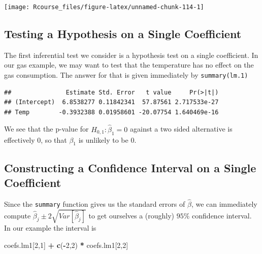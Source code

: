 \documentclass[]{book}
\newenvironment{Shaded}{\begin{snugshade}}{\end{snugshade}}
\newcommand{\KeywordTok}[1]{\textcolor[rgb]{0.13,0.29,0.53}{\textbf{#1}}}
\newcommand{\DecValTok}[1]{\textcolor[rgb]{0.00,0.00,0.81}{#1}}
\newcommand{\StringTok}[1]{\textcolor[rgb]{0.31,0.60,0.02}{#1}}
\newcommand{\OperatorTok}[1]{\textcolor[rgb]{0.81,0.36,0.00}{\textbf{#1}}}
\newcommand{\NormalTok}[1]{#1}
\theoremstyle{definition}
\theoremstyle{definition}
\theoremstyle{definition}
\theoremstyle{remark}
\begin{document}
\texttt{[image: Rcourse\_files/figure-latex/unnamed-chunk-114-1]}

\subsection{Testing a Hypothesis on a Single
Coefficient}\label{testing-a-hypothesis-on-a-single-coefficient}

The first inferential test we consider is a hypothesis test on a single
coefficient. In our gas example, we may want to test that the
temperature has no effect on the gas consumption. The answer for that is
given immediately by \texttt{summary(lm.1)}

\begin{Shaded}
\end{Shaded}

\begin{verbatim}
##               Estimate Std. Error   t value     Pr(>|t|)
## (Intercept)  6.8538277 0.11842341  57.87561 2.717533e-27
## Temp        -0.3932388 0.01958601 -20.07754 1.640469e-16
\end{verbatim}

We see that the p-value for \(H_{0,1}:\hat \beta_1=0\) against a two
sided alternative is effectively 0, so that \(\beta_1\) is unlikely to
be \(0\).

\subsection{Constructing a Confidence Interval on a Single
Coefficient}\label{constructing-a-confidence-interval-on-a-single-coefficient}

Since the \texttt{summary} function gives us the standard errors of
\(\hat \beta\), we can immediately compute
\(\hat \beta_j \pm 2 \sqrt{Var[\hat \beta_j]}\) to get ourselves a
(roughly) \(95\%\) confidence interval. In our example the interval is

\begin{Shaded}
\begin{Highlighting}[]
\NormalTok{coefs.lm1[}\DecValTok{2}\NormalTok{,}\DecValTok{1}\NormalTok{] }\OperatorTok{+}\StringTok{ }\KeywordTok{c}\NormalTok{(}\OperatorTok{-}\DecValTok{2}\NormalTok{,}\DecValTok{2}\NormalTok{) }\OperatorTok{*}\StringTok{ }\NormalTok{coefs.lm1[}\DecValTok{2}\NormalTok{,}\DecValTok{2}\NormalTok{]}
\end{Highlighting}
\end{Shaded}
\end{document}
